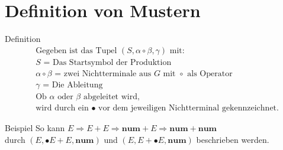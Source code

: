 \documentclass[t]{beamer}
\begin{document}
    \section{Definition von Mustern}\label{sec:muster}
    \begin{frame}
        \begin{block}{Definition\cite{softwarelanguage}}
            \vspace{-1em}
            \begin{align*}
                &\text{Gegeben ist das Tupel } (S, \alpha \circ \beta, \gamma) \text{ mit:} \\
                &S \text{ = Das Startsymbol der Produktion} \\
                &\alpha \circ \beta \text{ = zwei Nichtterminale aus } G \text{ mit } \circ \text{ als Operator} \\
                &\gamma \text{ = Die Ableitung} \\
                &\text{Ob } \alpha \text{ oder } \beta \text{ abgeleitet wird,} \\
                &\text{wird durch ein } \bullet \text{ vor dem jeweiligen Nichtterminal gekennzeichnet.}
            \end{align*}
        \end{block}
        \bigskip
        \begin{exampleblock}{Beispiel}
            So kann $E \Rightarrow E + E \Rightarrow \mathbf{num} + E \Rightarrow \mathbf{num} + \mathbf{num}$ \\ durch
            $(E, \bullet{E}+E, \mathbf{num})$ und $(E, E+\bullet{E}, \mathbf{num})$ beschrieben werden.
        \end{exampleblock}
    \end{frame}
\end{document}
